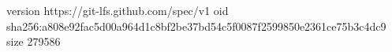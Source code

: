 version https://git-lfs.github.com/spec/v1
oid sha256:a808e92fac5d00a964d1c8bf2be37bd54c5f0087f2599850e2361ce75b3c4dc9
size 279586
